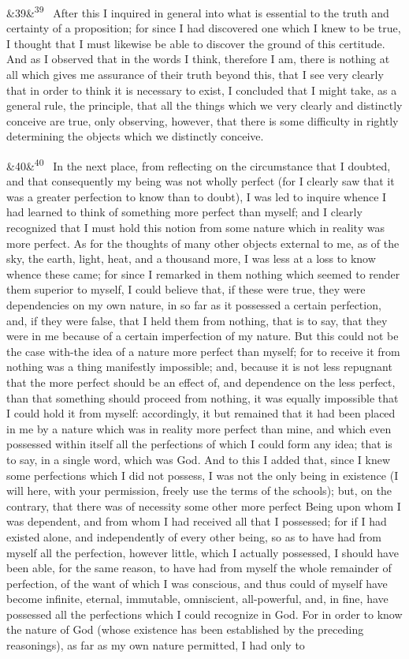\documentclass[12pt]{article}
\newcommand{\para}[1][]{\par\noindent\ifx&#1&\else\textsuperscript{\footnotesize #1}~\fi}
\begin{document}
\para[39] After this I inquired in general into what is essential to the truth and certainty of a proposition; for since I had discovered one which I knew to be true, I thought that I must likewise be able to discover the ground of this certitude. And as I observed that in the words I think, therefore I am, there is nothing at all which gives me assurance of their truth beyond this, that I see very clearly that in order to think it is necessary to exist, I concluded that I might take, as a general rule, the principle, that all the things which we very clearly and distinctly conceive are true, only observing, however, that there is some difficulty in rightly determining the objects which we distinctly conceive.

\para[40] In the next place, from reflecting on the circumstance that I doubted, and that consequently my being was not wholly perfect (for I clearly saw that it was a greater perfection to know than to doubt), I was led to inquire whence I had learned to think of something more perfect than myself; and I clearly recognized that I must hold this notion from some nature which in reality was more perfect. As for the thoughts of many other objects external to me, as of the sky, the earth, light, heat, and a thousand more, I was less at a loss to know whence these came; for since I remarked in them nothing which seemed to render them superior to myself, I could believe that, if these were true, they were dependencies on my own nature, in so far as it possessed a certain perfection, and, if they were false, that I held them from nothing, that is to say, that they were in me because of a certain imperfection of my nature. But this could not be the case with-the idea of a nature more perfect than myself; for to receive it from nothing was a thing manifestly impossible; and, because it is not less repugnant that the more perfect should be an effect of, and dependence on the less perfect, than that something should proceed from nothing, it was equally impossible that I could hold it from myself: accordingly, it but remained that it had been placed in me by a nature which was in reality more perfect than mine, and which even possessed within itself all the perfections of which I could form any idea; that is to say, in a single word, which was God. And to this I added that, since I knew some perfections which I did not possess, I was not the only being in existence (I will here, with your permission, freely use the terms of the schools); but, on the contrary, that there was of necessity some other more perfect Being upon whom I was dependent, and from whom I had received all that I possessed; for if I had existed alone, and independently of every other being, so as to have had from myself all the perfection, however little, which I actually possessed, I should have been able, for the same reason, to have had from myself the whole remainder of perfection, of the want of which I was conscious, and thus could of myself have become infinite, eternal, immutable, omniscient, all-powerful, and, in fine, have possessed all the perfections which I could recognize in God. For in order to know the nature of God (whose existence has been established by the preceding reasonings), as far as my own nature permitted, I had only to 
\end{document}
